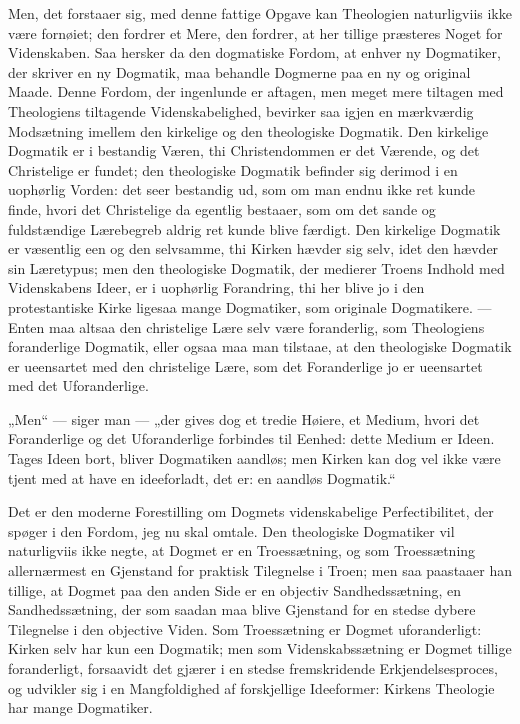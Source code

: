 \documentclass[12pt,a4paper]{book}
\newcommand{\opage}[1]{\marginnote{\footnotesize\textit{[#1]}}}
\begin{document}
Men, det forstaaer sig, med denne fattige Opgave kan Theologien naturligviis
ikke være fornøiet; den fordrer et Mere, den fordrer, at her tillige præsteres
Noget for Videnskaben. Saa hersker da den dogmatiske Fordom, at enhver ny
Dogmatiker, der skriver en ny Dogmatik, maa behandle Dogmerne paa en ny og
original Maade. Denne Fordom, der ingenlunde er aftagen, men meget mere
tiltagen med Theologiens tiltagende Videnskabelighed, bevirker saa igjen en
mærkværdig Modsætning imellem den kirkelige og den theologiske Dogmatik. Den
kirkelige Dogmatik er i bestandig Væren, thi Christendommen er det Værende, og
det Christelige er fundet; den theologiske Dogmatik befinder sig derimod i en
uophørlig Vorden: det seer bestandig ud, som om man endnu ikke ret kunde finde,
hvori det Christelige da egentlig bestaaer, som om det sande og fuldstændige
Lærebegreb aldrig ret kunde blive færdigt. Den kirkelige Dogmatik er væsentlig
een og den selvsamme, thi Kirken hævder sig selv, idet den hævder sin
Læretypus; men den theologiske Dogmatik, der medierer Troens Indhold med
Videnskabens Ideer, er i uophørlig Forandring, thi her blive jo i den
protestantiske Kirke ligesaa mange Dogmatiker, som originale Dogmatikere. ---
Enten maa altsaa den christelige Lære selv være foranderlig, som Theologiens
foranderlige Dogmatik, eller ogsaa maa man tilstaae, at den theologiske
Dogmatik er ueensartet med den christelige Lære, som det Foranderlige jo er
ueensartet med det Uforanderlige.

„Men“ --- siger man --- „der gives dog et tredie Høiere, et Medium, hvori det
Foranderlige og det Uforanderlige forbindes til Eenhed: dette Medium er Ideen.
Tages Ideen bort,
\opage{123} bliver Dogmatiken aandløs; men Kirken kan dog vel ikke være tjent med at have
en ideeforladt, det er: en aandløs Dogmatik.“

Det er den moderne Forestilling om Dogmets videnskabelige Perfectibilitet, der
spøger i den Fordom, jeg nu skal omtale. Den theologiske Dogmatiker vil
naturligviis ikke negte, at Dogmet er en Troessætning, og som Troessætning
allernærmest en Gjenstand for praktisk Tilegnelse i Troen; men saa paastaaer
han tillige, at Dogmet paa den anden Side er en objectiv Sandhedssætning, en
Sandhedssætning, der som saadan maa blive Gjenstand for en stedse dybere
Tilegnelse i den objective Viden. Som Troessætning er Dogmet uforanderligt:
Kirken selv har kun een Dogmatik; men som Videnskabssætning er Dogmet tillige
foranderligt, forsaavidt det gjærer i en stedse fremskridende
Erkjendelsesproces, og udvikler sig i en Mangfoldighed af forskjellige
Ideeformer: Kirkens Theologie har mange Dogmatiker.
\end{document}
